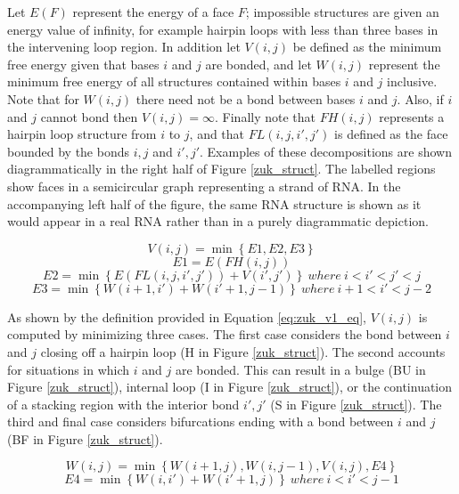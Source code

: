 \documentclass{cshonours}
\begin{document}
Let $E(F)$ represent the energy of a face $F$; impossible structures are given
an energy value of infinity, for example hairpin loops with less than three bases in the
intervening loop region. In addition let $V(i, j)$ be defined as the minimum free
energy given that bases $i$ and $j$ are bonded, and let $W(i, j)$ represent
the minimum free energy of all structures contained within bases $i$ and $j$ inclusive.
Note that for $W(i, j)$ there need not be a bond between bases $i$ and $j$. Also,
if $i$ and $j$ cannot bond then $V(i, j) = \infty $. Finally note that $FH(i, j)$ represents a
hairpin loop structure from $i$ to $j$, and that $FL(i, j, i' , j' )$ is defined as the face bounded by the bonds $i, j$ and $i', j'$. Examples of these decompositions are shown
diagrammatically in the right half of Figure \ref{zuk_struct}. The labelled regions show faces
in a semicircular graph representing a strand of RNA. In the accompanying left
half of the figure, the same RNA structure is shown as it would appear in a real
RNA rather than in a purely diagrammatic depiction.

\begin{equation} \label{eq:zuk_v1_eq}
V(i, j) = \min \left\lbrace E1, E2, E3 \right\rbrace
\end{equation}
$$E1 = E(FH(i, j))$$
$$E2 = \min \left\lbrace E(FL(i, j, i', j')) + V (i', j') \right\rbrace \: where \: i < i' < j' < j$$
$$E3 = \min \left\lbrace W (i + 1, i') + W (i' + 1, j - 1) \right\rbrace \: where \: i + 1 < i' < j - 2$$


As shown by the definition provided in Equation \ref{eq:zuk_v1_eq}, $V (i, j)$ is computed by minimizing
three cases. The first case considers the bond between $i$ and $j$ closing off a hairpin
loop (H in Figure \ref{zuk_struct}). The second accounts for situations in which $i$ and $j$ are bonded. This can result in a bulge (BU in Figure \ref{zuk_struct}), internal loop (I in Figure \ref{zuk_struct}), or the continuation of a stacking region with the
interior bond $i',j'$ (S in Figure \ref{zuk_struct}). The third and final case considers bifurcations ending with a bond between $i$ and $j$ (BF in Figure \ref{zuk_struct}).

\begin{equation} \label{eq:zuk_v1_eq2}
W (i, j) = \min \left\lbrace W(i + 1, j), W(i, j - 1), V(i, j), E4 \right\rbrace
\end{equation}
$$
E4 = \min \left\lbrace W (i, i') + W (i' + 1, j) \right\rbrace \: where \: i < i' < j - 1
$$
\end{document}
